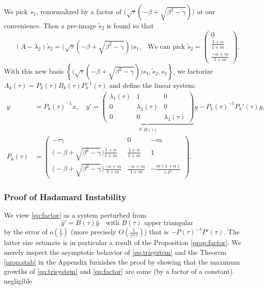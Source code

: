 \documentclass[a4paper,11pt]{article}
\def\l{{\ell}}
\theoremstyle{remark}
\begin{document}
We pick $s_1$, renormalized by a factor of $\Big(\sqrt{\tau}(-\beta+\sqrt{\beta^2-\gamma})\Big)$ at our convenience. Then a pre-image $\tilde s_2$ is found so that
$$ (A-\lambda_2) \tilde s_2 = \Big(\sqrt{\tau}(-\beta+\sqrt{\beta^2-\gamma})\Big)s_1. \quad \text{We can pick $\tilde s_2 = \begin{pmatrix}  0 \\ \tfrac{1+\alpha}{1+m} \\ \tfrac{-\alpha+m}{1+m} \end{pmatrix}$}.$$
With this new basis $\left\{\Big(\sqrt{\tau}(-\beta+\sqrt{\beta^2-\gamma})\Big)s_1,\tilde s_2, s_3 \right\}$, we factorize \\$A_k(\tau) = P_k(\tau)B_k(\tau)P_k^{-1}(\tau)$ and define the linear system:
\begin{equation}\label{eq:factor}
\begin{aligned}
 y &= P_k(\tau)^{-1} x, \quad  y' = \underbrace{\begin{pmatrix} \lambda_1(\tau) & 1 & 0\\0 & \lambda_2(\tau) & 0\\0 & 0 & \lambda_3(\tau)\end{pmatrix}}_{\triangleq B(\tau)} y - P_k(\tau)^{-1}P_k'(\tau) y,\\
 P_k(\tau) &= \begin{pmatrix} -\tau\gamma& 0 & -m\\ \Big(-\beta+\sqrt{\beta^2-\gamma}\Big)\frac{1+\alpha}{1+m} & \frac{1+\alpha}{1+m} & 1\\ \Big(-\beta+\sqrt{\beta^2-\gamma}\Big)\frac{-\alpha+m}{1+m} & \frac{-\alpha+m}{1+m} & -\frac{m(1+\alpha)}{\tau\l^2}\end{pmatrix}.
\end{aligned}
\end{equation}

\subsubsection{Proof of Hadamard Instability}

We view \eqref{eq:factor} as a system perturbed from
\begin{equation} \label{eq:trisystem}
  \hat{y}' = B(\tau)\hat{y} \quad \text{with $B(\tau)$ upper triangular}
\end{equation}
by the error of $o(\frac{1}{\tau})$ (more precisely $O(\frac{1}{\tau^{3/2}})$) that is $- P(\tau)^{-1}P'(\tau)$. The latter size estimate is in particular a result of the Proposition \ref{prop:factor}. We merely inspect the asymptotic behavior of \eqref{eq:trisystem} and the Theorem \ref{prop:stab} in the Appendix furnishes the proof by showing that the maximum growths of \eqref{eq:trisystem} and \eqref{eq:factor} are same (by a factor of a constant). %
negligible
\end{document}
